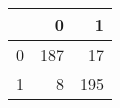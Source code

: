 \begin{tabular}{lrr}
\toprule
{} &    0 &    1 \\
\midrule
0 &  187 &   17 \\
1 &    8 &  195 \\
\bottomrule
\end{tabular}
